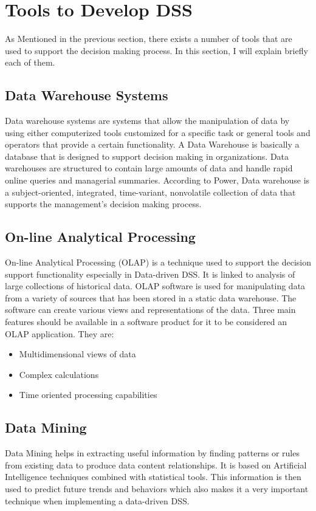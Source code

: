\section{Tools to Develop DSS}
\label{sec:ToolsToDevelopDSS}
As Mentioned in the previous section, there exists a number of tools that are used to support the decision making process. In this section, I will explain briefly each of them.
\subsection{Data Warehouse Systems}
\indent Data warehouse systems are systems that allow the manipulation of data by using either computerized tools customized for a specific task or general tools and operators that provide a certain functionality. A Data Warehouse is basically a database that is designed to support decision making in organizations. Data warehouses are structured to contain large amounts of data and handle rapid online queries and managerial summaries. According to Power\cite{power2007brief}, Data warehouse is a subject-oriented, integrated, time-variant, nonvolatile collection of data that supports the management's decision making process.
\subsection{On-line Analytical Processing}
\indent On-line Analytical Processing (OLAP) is a technique used to support the decision support functionality especially in Data-driven DSS. It is linked to analysis of large collections of historical data.\cite{DDSTypes} OLAP software is used for manipulating data from a variety of sources that has been stored in a static data warehouse. The software can create various views and representations of the data.\cite{DDSTypes} Three main features should be available in a software product for it to be considered an OLAP application. They are: 
\begin{itemize}
\item Multidimensional views of data
\item Complex calculations
\item Time oriented processing capabilities
\end{itemize}
\subsection{Data Mining}
\indent Data Mining helps in extracting useful information by finding patterns or rules from existing data to produce data content relationships. It is based on Artificial Intelligence techniques combined with statistical tools. This information is then used to predict future trends and behaviors which also makes it a very important technique when implementing a data-driven DSS.
